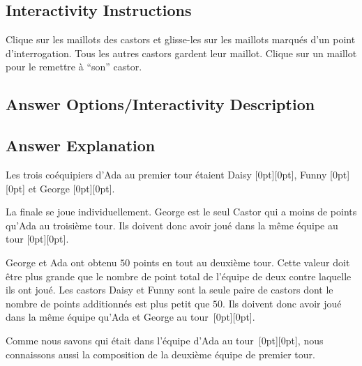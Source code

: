 \documentclass[a4paper,11pt]{report}
\newcommand{\taskGraphicsFolder}{..}
\begin{document}
\subsection*{Interactivity Instructions}

Clique sur les maillots des castors et glisse-les sur les maillots marqués d’un point d’interrogation. Tous les autres castors gardent leur maillot. Clique sur un maillot pour le remettre à “son” castor.

\begingroup
\renewcommand{\arraystretch}{1.5}
\subsection*{Answer Options/Interactivity Description}



\endgroup

\subsection*{Answer Explanation}

Les trois coéquipiers d’Ada au premier tour étaient Daisy \raisebox{-0.5ex}[0pt][0pt]{}, Funny \raisebox{-0.5ex}[0pt][0pt]{} et George \raisebox{-0.5ex}[0pt][0pt]{}.

La finale se joue individuellement. George est le seul Castor qui a moins de points qu’Ada au troisième tour. Ils doivent donc avoir joué dans la même équipe au tour \raisebox{-0.5ex}[0pt][0pt]{}.

George et Ada ont obtenu $50$ points en tout au deuxième tour. Cette valeur doit être plus grande que le nombre de point total de l’équipe de deux contre laquelle ils ont joué. Les castors Daisy et Funny sont la seule paire de castors dont le nombre de points additionnés est plus petit que $50$. Ils doivent donc avoir joué dans la même équipe qu’Ada et George au tour~\raisebox{-0.5ex}[0pt][0pt]{}.

Comme nous savons qui était dans l’équipe d’Ada au tour~\raisebox{-0.5ex}[0pt][0pt]{}, nous connaissons aussi la composition de la deuxième équipe de premier tour.
\end{document}
